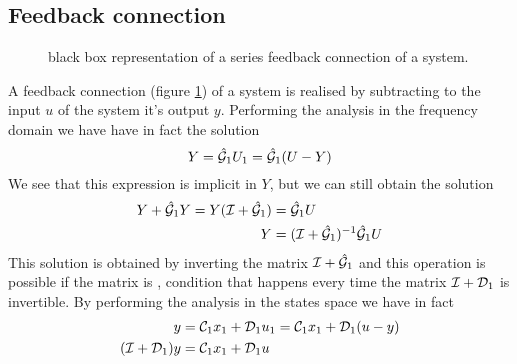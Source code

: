 	\subsection{Feedback connection}	
		\begin{figure}[bt]
			\centering
			\caption{black box representation of a series feedback connection of a system.} \label{fig:dyn:feedback}
		\end{figure}
		
		A feedback connection (figure \ref{fig:dyn:feedback}) of a system is realised by subtracting to the input $u$ of the system it's output $y$. Performing the analysis in the frequency domain we have have in fact the solution
		\[ Y = \hat{\mathcal{G}}_1 U_1 = \hat{\mathcal{G}}_1 (U-Y) \]
		We see that this expression is implicit in $Y$, but we can still obtain the solution
		\begin{equation}
		\begin{split}
			Y + \hat{\mathcal{G}}_1 Y = Y(\mathcal{I} + \hat {\mathcal{G}}_1)& =\hat{\mathcal{G}}_1 U \\
			Y &= (\mathcal{I} + \hat {\mathcal{G}}_1)^{-1} \hat {\mathcal{G}}_1 U
		\end{split}
		\end{equation}
		This solution is obtained by inverting the matrix $\mathcal{I} + \hat {\mathcal{G}}_1$ and this operation is possible if the matrix is \textit{}, condition that happens every time the matrix $\mathcal{I} + \mathcal{D}_1$ is invertible. By performing the analysis in the states space we have in fact 
		\begin{align*}
			y & = \mathcal{C}_1 x_1 + \mathcal{D}_1 u_1 = \mathcal{C}_1 x_1 + \mathcal{D}_1 (u-y) \\
			(\mathcal{I} + \mathcal{D}_1) y & = \mathcal{C}_1 x_1 + \mathcal{D}_1 u
		\end{align*}
		
		
		
		
		
		
		
		
		
		
		
		
		
		
		
		
		
		
		
		
		
		